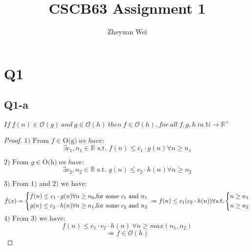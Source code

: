 \documentclass{article}
\title{CSCB63 Assignment 1}
\author{Zheyuan Wei}
\begin{document}
\maketitle

\section*{Q1}

\subsection*{Q1-a}


$ If\ f(n) \in \mathcal{O}(g)\ and\ g \in \mathcal{O}(h)\ then\ f \in \mathcal{O}(h), for\ all\ f, g, h \ in\ \mathbb{N} \rightarrow \mathbb{R^+} $

\begin{proof}

    \text{\newline}

    $ \text{1) From } f \in \text{O(g)} \ we\ have: $
    $$ \exists c_1, n_1 \in \mathbb{R} \text{ s.t. } f(n) \leq c_1 \cdot g(n) \forall n \geq n_1 $$

    $ \text{2) From } g \in \text{O(h)} \ we\ have: $
    $$ \exists c_2, n_2 \in \mathbb{R} \text{ s.t. } g(n) \leq c_2 \cdot h(n) \forall n \geq n_2 $$

    $ \text{3) From 1) \ and\ 2) \ we\ have: }$
    $$ f(x)=\left\{
        \begin{aligned}
            f(n) \leq c_1 \cdot g(n) \forall n \geq n_0, & \text{for some $c_1$ and $n_1$} \\
            g(n) \leq c_2 \cdot h(n) \forall n \geq n_1, & \text{for some $c_2$ and $n_2$} \\
        \end{aligned}
        \right.\\
        \Rightarrow
        \begin{aligned}
            f(n) \leq c_1 ( c_2 \cdot h(n) ) \forall s.t.
            \left\{
            \begin{aligned}
                n \geq n_1 \\
                n \geq n_2 \\
            \end{aligned}
            \right.
        \end{aligned}
    $$
    $ \text{4) From 3) \ we\ have: }$
    $$ f(n) \leq c_1 \cdot c_2 \cdot h(n)\ \forall n \geq max(n_1, n_2) $$
    $$ \Rightarrow f \in \mathcal{O}(h) $$

\end{proof}
\end{document}
